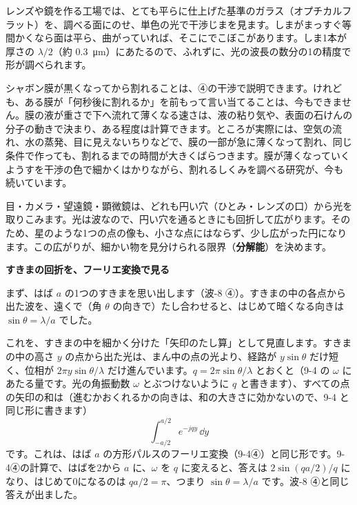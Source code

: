 \begin{phmijika}[光で平らさを調べる]
レンズや鏡を作る工場では、とても平らに仕上げた基準のガラス（オプチカルフラット）を、調べる面にのせ、単色の光で干渉じまを見ます。しまがまっすぐ等間かくなら面は平ら、曲がっていれば、そこにでこぼこがあります。しま1本が厚さの $\lambda/2$（約 \qty{0.3}{\micro m}）にあたるので、ふれずに、光の波長の数分の1の精度で形が調べられます。
\end{phmijika}

\begin{phmada}
シャボン膜が黒くなってから割れることは、④の干渉で説明できます。けれども、ある膜が「何秒後に割れるか」を前もって言い当てることは、今もできません。膜の液が重さで下へ流れて薄くなる速さは、液の粘り気や、表面の石けんの分子の動きで決まり、ある程度は計算できます。ところが実際には、空気の流れ、水の蒸発、目に見えないちりなどで、膜の一部が急に薄くなって割れ、同じ条件で作っても、割れるまでの時間が大きくばらつきます。膜が薄くなっていくようすを干渉の色で細かくはかりながら、割れるしくみを調べる研究が、今も続いています。
\end{phmada}

\phkokomade



\leavevmode\label{ph:波-13:sec5}目・カメラ・望遠鏡・顕微鏡は、どれも円い穴（ひとみ・レンズの口）から光を取りこみます。光は波なので、円い穴を通るときにも回折して広がります。そのため、星のような1つの点の像も、小さな点にはならず、少し広がった円になります。この広がりが、細かい物を見分けられる限界（\textbf{分解能}）を決めます。

\noindent\textbf{すきまの回折を、フーリエ変換で見る}\par\nobreak
まず、はば $a$ の1つのすきまを思い出します（波-8 ④）。すきまの中の各点から出た波を、遠くで（角 $\theta$ の向きで）たし合わせると、はじめて暗くなる向きは $\sin\theta=\lambda/a$ でした。

これを、すきまの中を細かく分けた「矢印のたし算」として見直します。すきまの中の高さ $y$ の点から出た光は、まん中の点の光より、経路が $y\sin\theta$ だけ短く、位相が $2\pi y\sin\theta/\lambda$ だけ進んでいます。$q=2\pi\sin\theta/\lambda$ とおくと（9-4 の $\omega$ にあたる量です。光の角振動数 $\omega$ とぶつけないように $q$ と書きます）、すべての点の矢印の和は（進むかおくれるかの向きは、和の大きさに効かないので、9-4 と同じ形に書きます）
\[ \int_{-a/2}^{a/2}e^{-jqy}\,\dd y \]
です。これは、はば $a$ の方形パルスのフーリエ変換（9-4④）と同じ形です。9-4④の計算で、はばを2から $a$ に、$\omega$ を $q$ に変えると、答えは $2\sin(qa/2)/q$ になり、はじめて0になるのは $qa/2=\pi$、つまり $\sin\theta=\lambda/a$ です。波-8 ④と同じ答えが出ました。

